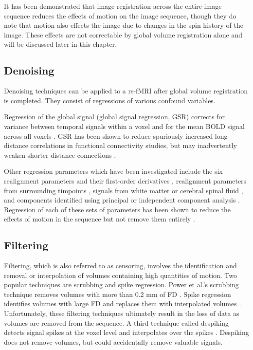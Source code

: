 It has been demonstrated that image registration across the entire image sequence reduces the effects of motion on the image sequence, though they do note that motion also effects the image due to changes in the spin history of the image. These effects are not correctable by global volume registration alone and will be discussed later in this chapter.

\subsection{Denoising}

Denoising techniques can be applied to a rs-fMRI after global volume registration is completed. They consist of regressions of various confound variables. 

Regression of the global signal (global signal regression, GSR) corrects for variance between temporal signals within a voxel and for the mean BOLD signal across all voxels \cite{Power2014} \cite{Satterthwaite2013} \cite{Yan2013} \cite{Yan2013a}. GSR has been shown to reduce spuriously increased long-distance correlations in functional connectivity studies, but may inadvertently weaken shorter-distance connections \cite{Jo2013} \cite{Power2014}  \cite{Satterthwaite2012}. 

Other regression parameters which have been investigated include the six realignment parameters and their first-order derivatives \cite{Power2012} \cite{Satterthwaite2012} \cite{VanDijk2012}, realignment parameters from surrounding timpoints \cite{Patriat2017} \cite{Power2014} \cite{Satterthwaite2013} \cite{Yan2013a}, signals from white matter or cerebral spinal fluid \cite{Power2014} \cite{Satterthwaite2013} \cite{Yan2013a} \cite{Jo2010}, and components identified using principal or independent component analysis \cite{Pruim2015} \cite{Salimi-Khorshidi2014} \cite{Behzadi2007}. Regression of each of these sets of parameters has been shown to reduce the effects of motion in the sequence but not remove them entirely \cite{Power2015} \cite{Parkes2017}. 


\subsection{Filtering}

Filtering, which is also referred to as censoring, involves the identification and removal or interpolation of volumes containing high quantities of motion. Two popular techniques are scrubbing and spike regression. Power et al.’s scrubbing technique removes volumes with more than 0.2 mm of FD \cite{Power2012}. Spike regression identifies volumes with large FD and replaces them with interpolated volumes \cite{Satterthwaite2013}. Unfortunately, these filtering techniques ultimately result in the loss of data as volumes are removed from the sequence. A third technique called despiking detects signal spikes at the voxel level and interpolates over the spikes \cite{Jo2013} \cite{Patel2014}. Despiking does not remove volumes, but could accidentally remove valuable signals. 

